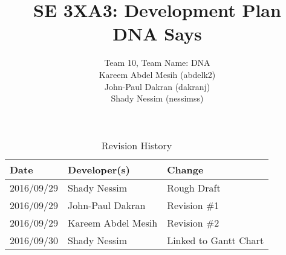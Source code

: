 \documentclass{article}
\title{SE 3XA3: Development Plan\\DNA Says}
\author{Team 10, Team Name: DNA
		\\ Kareem Abdel Mesih (abdelk2)
		\\ John-Paul Dakran (dakranj)
		\\ Shady Nessim (nessimss)
}
\date{}
\begin{document}
\begin{table}[hp]
\caption{Revision History} \label{TblRevisionHistory}
\begin{tabularx}{\textwidth}{llX}
\toprule
\textbf{Date} & \textbf{Developer(s)} & \textbf{Change}\\
\midrule
2016/09/29 & Shady Nessim & Rough Draft\\
2016/09/29 & John-Paul Dakran &  Revision \#1\\
2016/09/29 & Kareem Abdel Mesih &  Revision \#2\\
2016/09/30 & Shady Nessim & Linked to Gantt Chart\\
\bottomrule
\end{tabularx}
\end{table}
\newpage
\maketitle
\newpage
\end{document}
